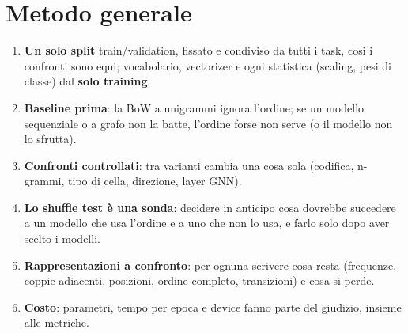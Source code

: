 \section{Metodo generale}
\begin{enumerate}
  \item \textbf{Un solo split} train/validation, fissato e condiviso da tutti i task, così i confronti
        sono equi; vocabolario, vectorizer e ogni statistica (scaling, pesi di classe) dal
        \textbf{solo training}.
  \item \textbf{Baseline prima}: la BoW a unigrammi ignora l'ordine; se un modello sequenziale o a
        grafo non la batte, l'ordine forse non serve (o il modello non lo sfrutta).
  \item \textbf{Confronti controllati}: tra varianti cambia una cosa sola (codifica, n-grammi, tipo
        di cella, direzione, layer GNN).
  \item \textbf{Lo shuffle test è una sonda}: decidere in anticipo cosa dovrebbe succedere a un
        modello che usa l'ordine e a uno che non lo usa, e farlo solo dopo aver scelto i modelli.
  \item \textbf{Rappresentazioni a confronto}: per ognuna scrivere cosa resta (frequenze, coppie
        adiacenti, posizioni, ordine completo, transizioni) e cosa si perde.
  \item \textbf{Costo}: parametri, tempo per epoca e device fanno parte del giudizio, insieme alle
        metriche.
\end{enumerate}

